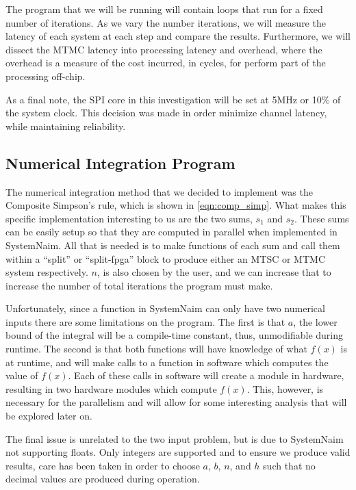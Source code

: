 The program that we will be running will contain loops that run for a fixed number of iterations. As we vary the number iterations, we will measure the latency of each system at each step and compare the results. Furthermore, we will dissect the MTMC latency into processing latency and overhead, where the overhead is a measure of the cost incurred, in cycles, for perform part of the processing off-chip.

As a final note, the SPI core in this investigation will be set at 5MHz or 10\% of the system clock. This decision was made in order minimize channel latency, while maintaining reliability.

\subsection{Numerical Integration Program}

The numerical integration method that we decided to implement was the Composite Simpson's rule, which is shown in \autoref{eqn:comp_simp}. What makes this specific implementation interesting to us are the two sums, $s_1$ and $s_2$. These sums can be easily setup so that they are computed in parallel when implemented in SystemNaim. All that is needed is to make functions of each sum and call them within a “split” or “split-fpga” block to produce either an MTSC or MTMC system respectively. $n$, is also chosen by the user, and we can increase that to increase the number of total iterations the program must make.

Unfortunately, since a function in SystemNaim can only have two numerical inputs there are some limitations on the program. The first is that $a$, the lower bound of the integral will be a compile-time constant, thus, unmodifiable during runtime. The second is that both functions will have knowledge of what $f(x)$ is at runtime, and will make calls to a function in software which computes the value of $f(x)$. Each of these calls in software will create a module in hardware, resulting in two hardware modules which compute $f(x)$. This, however, is necessary for the parallelism and will allow for some interesting analysis that will be explored later on.

The final issue is unrelated to the two input problem, but is due to SystemNaim not supporting floats. Only integers are supported and to ensure we produce valid results, care has been taken in order to choose $a$, $b$, $n$, and $h$ such that no decimal values are produced during operation.

